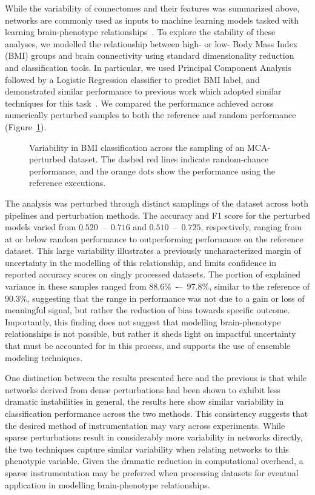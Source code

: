 \documentclass[10pt,letterpaper]{article}
\begin{document}
While the variability of connectomes and their features was summarized above, networks 
are commonly used as inputs to machine learning models tasked with learning
brain-phenotype relationships~\cite{Dubois2016-yr}. To explore the stability of these
analyses, we modelled the relationship between high- or low- Body Mass Index (BMI)
groups and brain connectivity using standard dimensionality reduction and
classification tools. In particular, we used Principal Component Analysis followed by
a Logistic Regression classifier to predict BMI label, and demonstrated similar
performance to previous work which adopted similar techniques for this
task~\cite{Park2015-uj,Gupta2015-ap}. We compared the performance achieved across
numerically perturbed samples to both the reference and random performance
(Figure~\ref{fig:bmi}).

\begin{figure}[ht]\centering
\caption{Variability in BMI classification across the sampling of an MCA-perturbed
dataset. The dashed red lines indicate random-chance performance, and the orange dots
show the performance using the reference executions.}
\label{fig:bmi}
\end{figure}

The analysis was perturbed through distinct samplings of the dataset across both
pipelines and perturbation methods. The accuracy and F1 score for the perturbed models 
varied from $0.520$~–~$0.716$ and $0.510$~–~$0.725$, respectively, ranging from at or
below random performance to outperforming performance on the reference dataset. This
large variability illustrates a previously uncharacterized margin of uncertainty in
the modelling of this relationship, and limits confidence in reported accuracy scores
on singly processed datasets. The portion of explained variance in these samples
ranged from $88.6\%$~-–~$97.8\%$, similar to the reference of $90.3\%$, suggesting
that the range in performance was not due to a gain or loss of meaningful signal, but
rather the reduction of bias towards specific outcome. Importantly, this finding does
not suggest that modelling brain-phenotype relationships is not possible, but rather
it sheds light on impactful uncertainty that must be accounted for in this process,
and supports the use of ensemble modeling techniques.

One distinction between the results presented here and the previous is that while
networks derived from dense perturbations had been shown to exhibit less dramatic
instabilities in general, the results here show similar variability in classification
performance across the two methods. This consistency suggests that the desired method
of instrumentation may vary across experiments. While sparse perturbations result in
considerably more variability in networks directly, the two techniques capture similar 
variability when relating networks to this phenotypic variable. Given the dramatic
reduction in computational overhead, a sparse instrumentation may be preferred when
processing datasets for eventual application in modelling brain-phenotype
relationships.
\end{document}
